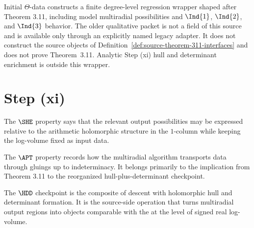 \begin{theorem}
  \label{thm:theorem-311-source-output}
  \leanok
  Initial \(\Theta\)-data constructs a finite degree-level regression wrapper
  shaped after Theorem 3.11, including model multiradial possibilities and
  \(\Ind{1}\), \(\Ind{2}\), and \(\Ind{3}\) behavior.  The older qualitative
  packet is not a field of this source and is available only through an
  explicitly named legacy adapter.  It does not construct the source objects
  of Definition~\ref{def:source-theorem-311-interfaces} and does not prove
  Theorem~3.11.  Analytic Step (xi) hull and determinant enrichment is outside
  this wrapper.
\end{theorem}

\section{Step (xi)}

\begin{definition}
  \label{def:she}
  \notready
  The \(\SHE\) property says that the relevant output possibilities may be
  expressed relative to the arithmetic holomorphic structure in the \(1\)-column
  while keeping the \qPilot{} log-volume fixed as input data.
\end{definition}

\begin{definition}
  \label{def:apt}
  \notready
  The \(\APT\) property records how the multiradial algorithm transports data
  through gluings up to indeterminacy.  It belongs primarily to the implication
  from Theorem 3.11 to the reorganized hull-plus-determinant checkpoint.
\end{definition}

\begin{definition}
  \label{def:hdd}
  \notready
  The \(\HDD\) checkpoint is the composite of descent with holomorphic hull
  and determinant formation.  It is the source-side operation that turns
  multiradial output regions into objects comparable with the \qPilot{} at
  the level of signed real log-volume.
\end{definition}


